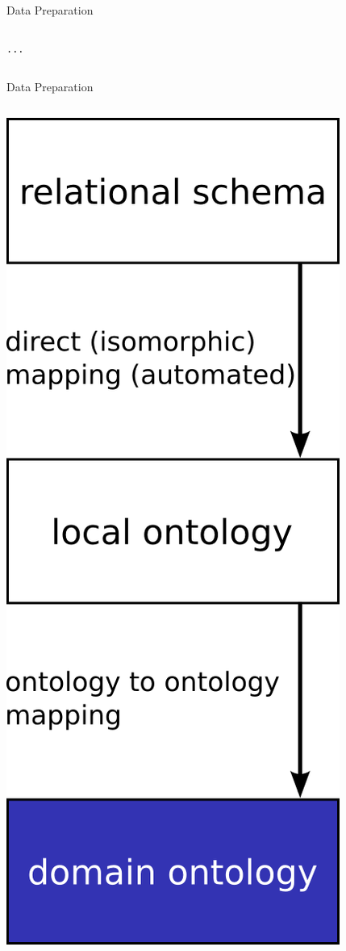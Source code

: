 \documentclass{beamer}
\begin{document}
\begin{frame}[fragile]{Data Preparation}
\begin{columns}
\begin{column}{.66\textwidth}
{\begin{verbatim}
...
\end{verbatim}
}
\end{column}%
\end{columns}
\end{frame}






\begin{frame}[fragile]{Data Preparation}
\begin{columns}
\begin{column}{.3\textwidth}
\includegraphics[width=\textwidth,height=.88\textheight,keepaspectratio]{g3}

\end{column}
\end{columns}
\end{frame}
\end{document}
